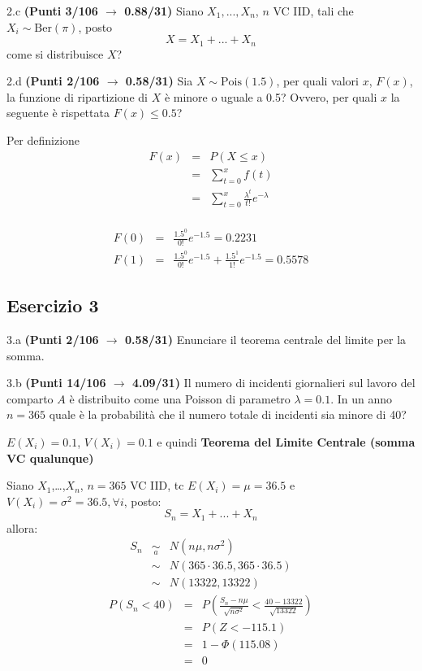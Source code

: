 \documentclass[
  11pt,
]{book}
\theoremstyle{mytheoremstyle}
\theoremstyle{mydefstyle}
\newenvironment{sol}
  {
  \begin{tcolorbox}[enhanced,breakable,arc=0.1mm,boxrule=1pt,colback=white,colframe=iblue,
  title=\bf \fontfamily{lmss}\selectfont \hspace{.5 cm} Soluzione,drop fuzzy shadow]

}{
\end{tcolorbox}
  }
\begin{document}
2.c \textbf{(Punti 3/106 \(\rightarrow\) 0.88/31)} Siano \(X_1,...,X_n\), \(n\) VC IID, tali che \(X_i\sim \text{Ber}(\pi)\), posto
\[
 X = X_1+...+X_n
\]
come si distribuisce \(X\)?

2.d \textbf{(Punti 2/106 \(\rightarrow\) 0.58/31)} Sia \(X\sim \text{Pois}(1.5)\), per quali valori \(x\), \(F(x)\), la funzione di ripartizione di \(X\) è minore o uguale a 0.5? Ovvero, per quali \(x\) la seguente è rispettata \(F(x)\le 0.5\)?

\begin{sol}
Per definizione
\begin{eqnarray*}
F(x)   &=&  P(X\le x)\\
       &=&\sum_{t=0}^x f(t)\\
       &=&\sum_{t=0}^x \frac{\lambda^t}{t!}e^{-\lambda}\\
\end{eqnarray*}

\begin{eqnarray*}
  F(0) &=&  \frac{1.5^0}{0!}e^{-1.5}=0.2231\\
  F(1) &=&  \frac{1.5^0}{0!}e^{-1.5}+  \frac{1.5^1}{1!}e^{-1.5}=0.5578
\end{eqnarray*}

\end{sol}

\subsection{Esercizio 3}\label{esercizio-3-9}

3.a \textbf{(Punti 2/106 \(\rightarrow\) 0.58/31)} Enunciare il teorema centrale del limite per la somma.

3.b \textbf{(Punti 14/106 \(\rightarrow\) 4.09/31)} Il numero di incidenti giornalieri sul lavoro del comparto \(A\) è distribuito come una
Poisson di parametro \(\lambda = 0.1\). In un anno \(n=365\) quale è la probabilità che il numero totale di
incidenti sia minore di 40?

\begin{sol}
\(E(X_i)=0.1\), \(V(X_i)=0.1\) e quindi
\textbf{Teorema del Limite Centrale (somma VC qualunque)}

Siano \(X_1\),\ldots,\(X_n\), \(n=365\) VC IID, tc \(E(X_i)=\mu=36.5\) e \(V(X_i)=\sigma^2=36.5,\forall i\), posto:
\[
      S_n = X_1 + ... + X_n
      \]
allora:\begin{eqnarray*}
  S_n & \mathop{\sim}\limits_{a}& N(n\mu,n\sigma^2) \\
     &\sim & N(365\cdot36.5,365\cdot36.5) \\
     &\sim & N(13322,13322) 
  \end{eqnarray*}\begin{eqnarray*}
      P( S_n   <   40 ) 
        &=& P\left(  \frac { S_n  -  n\mu }{ \sqrt{n\sigma^2} }  <  \frac { 40  -  13322 }{\sqrt{ 13322 }} \right)  \\
                 &=& P\left(  Z   <   -115.1 \right) \\    
                 &=&  1-\Phi( 115.08 ) \\ &=&  0 
      \end{eqnarray*}

\end{sol}
\end{document}
